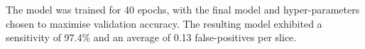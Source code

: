 The model was trained for 40 epochs, with the final model and hyper-parameters chosen to maximise validation accuracy. The resulting model exhibited a sensitivity of 97.4\% and an average of 0.13 false-positives per slice.



%
%
%
%
%
%
% 
% 
%
%
%
%
%
%
%
%
%
%
%
% 


